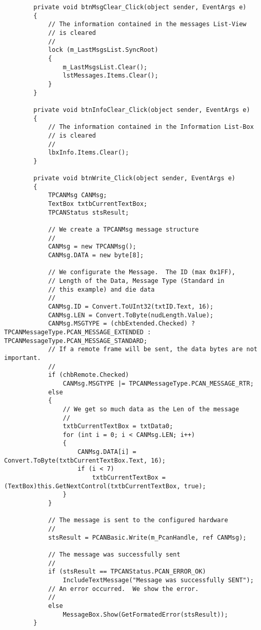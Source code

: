 \begin{lstlisting}
        private void btnMsgClear_Click(object sender, EventArgs e)
        {
            // The information contained in the messages List-View
            // is cleared
            //
            lock (m_LastMsgsList.SyncRoot)
            {
                m_LastMsgsList.Clear();
                lstMessages.Items.Clear();
            }
        }

        private void btnInfoClear_Click(object sender, EventArgs e)
        {
            // The information contained in the Information List-Box
            // is cleared
            //
            lbxInfo.Items.Clear();
        }

        private void btnWrite_Click(object sender, EventArgs e)
        {
            TPCANMsg CANMsg;
            TextBox txtbCurrentTextBox;
            TPCANStatus stsResult;

            // We create a TPCANMsg message structure
            //
            CANMsg = new TPCANMsg();
            CANMsg.DATA = new byte[8];

            // We configurate the Message.  The ID (max 0x1FF),
            // Length of the Data, Message Type (Standard in
            // this example) and die data
            //
            CANMsg.ID = Convert.ToUInt32(txtID.Text, 16);
            CANMsg.LEN = Convert.ToByte(nudLength.Value);
            CANMsg.MSGTYPE = (chbExtended.Checked) ? TPCANMessageType.PCAN_MESSAGE_EXTENDED : TPCANMessageType.PCAN_MESSAGE_STANDARD;
            // If a remote frame will be sent, the data bytes are not important.
            //
            if (chbRemote.Checked)
                CANMsg.MSGTYPE |= TPCANMessageType.PCAN_MESSAGE_RTR;
            else
            {
                // We get so much data as the Len of the message
                //
                txtbCurrentTextBox = txtData0;
                for (int i = 0; i < CANMsg.LEN; i++)
                {
                    CANMsg.DATA[i] = Convert.ToByte(txtbCurrentTextBox.Text, 16);
                    if (i < 7)
                        txtbCurrentTextBox = (TextBox)this.GetNextControl(txtbCurrentTextBox, true);
                }
            }

            // The message is sent to the configured hardware
            //
            stsResult = PCANBasic.Write(m_PcanHandle, ref CANMsg);

            // The message was successfully sent
            //
            if (stsResult == TPCANStatus.PCAN_ERROR_OK)
                IncludeTextMessage("Message was successfully SENT");
            // An error occurred.  We show the error.
            //
            else
                MessageBox.Show(GetFormatedError(stsResult));
        }


\end{lstlisting}
